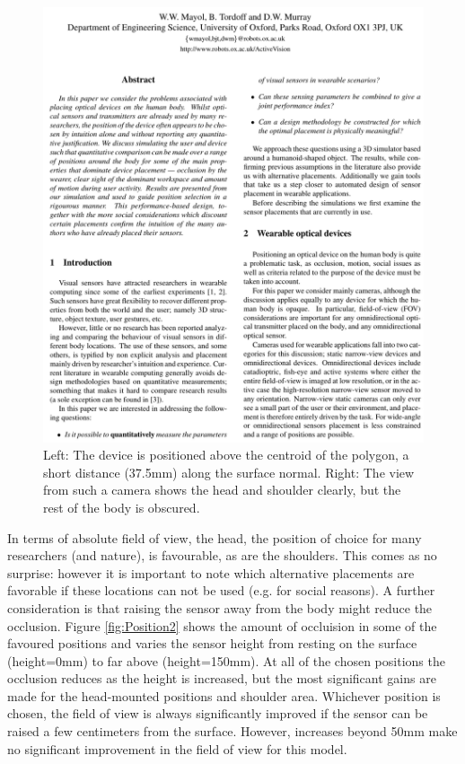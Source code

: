 \begin{figure}[htbp]
	\centering
		\includegraphics[page=3]{Figures/mayol_etal_ouel224101_cropped.pdf}
	\caption{Left: The device is positioned above the centroid of the polygon, a short distance (37.5mm) along the surface normal. Right: The view from such a camera shows the head and shoulder clearly, but the rest of the body is obscured.}
	\label{fig:Positioning1}
\end{figure}

In terms of absolute field of view, the head, the position of choice for many researchers (and nature), is favourable, as are the
shoulders. This comes as no surprise: however it is important to note which alternative placements are favorable if these locations can not be used (e.g. for social reasons). A further consideration is that raising the sensor away from the body might reduce the occlusion. Figure \ref{fig:Position2} shows the amount of occluision in some of the favoured positions and varies the sensor height from resting on the surface (height=0mm) to far above (height=150mm). At all of the chosen positions the occlusion reduces as the height is increased, but the most significant gains are made for the head-mounted positions and shoulder area. Whichever position is chosen, the field of view is always significantly improved if the sensor can be raised a few centimeters from the surface. However, increases beyond 50mm make no significant improvement in the field of view for this model.


